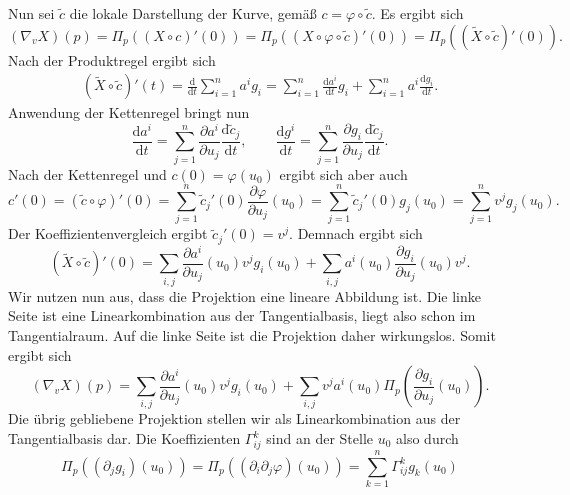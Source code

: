 Nun sei $\tilde c$ die lokale Darstellung der Kurve, gemäß
$c=\varphi\circ\tilde c$. Es ergibt sich
\begin{equation}
(\nabla_v X)(p) = \Pi_p((X\circ c)'(0))
= \Pi_p((X\circ\varphi\circ\tilde c)'(0))
= \Pi_p((\tilde X\circ\tilde c)'(0)).
\end{equation}
Nach der Produktregel ergibt sich
\begin{gather}
(\tilde X\circ\tilde c)'(t)
= \frac{\mathrm d}{\mathrm dt} \sum_{i=1}^n a^i g_i
= \sum_{i=1}^n \frac{\mathrm da^i}{\mathrm dt}g_i
+ \sum_{i=1}^n a^i\frac{\mathrm dg_i}{\mathrm dt}.
\end{gather}
Anwendung der Kettenregel bringt nun
\begin{equation}
\frac{\mathrm da^i}{\mathrm dt}
= \sum_{j=1}^n \frac{\partial a^i}{\partial u_j}
\frac{\mathrm d\tilde c_j}{\mathrm dt},\qquad
\frac{\mathrm dg^i}{\mathrm dt}
= \sum_{j=1}^n \frac{\partial g_i}{\partial u_j}
\frac{\mathrm d\tilde c_j}{\mathrm dt}.
\end{equation}
Nach der Kettenregel und $c(0)=\varphi(u_0)$ ergibt sich aber auch
\begin{equation}
c'(0) = (\tilde c\circ\varphi)'(0)
= \sum_{j=1}^n \tilde c_j'(0)\frac{\partial\varphi}{\partial u_j}(u_0)
= \sum_{j=1}^n \tilde c_j'(0)g_j(u_0)
= \sum_{j=1}^n v^j g_j(u_0).
\end{equation}
Der Koeffizientenvergleich ergibt $\tilde c_j'(0)=v^j$. Demnach ergibt sich
\begin{equation}
(\tilde X\circ\tilde c)'(0)
= \sum_{i,j} \frac{\partial a^i}{\partial u_j}(u_0) v^j g_i(u_0)
+ \sum_{i,j} a^i(u_0) \frac{\partial g_i}{\partial u_j}(u_0) v^j.
\end{equation}
Wir nutzen nun aus, dass die Projektion eine lineare Abbildung ist.
Die linke Seite ist eine Linearkombination aus der Tangentialbasis,
liegt also schon im Tangentialraum. Auf die linke Seite ist die
Projektion daher wirkungslos. Somit ergibt sich
\begin{equation}\label{eq:kov-Ableitung1}
(\nabla_v X)(p) = \sum_{i,j} \frac{\partial a^i}{\partial u_j}(u_0) v^j g_i(u_0)
+ \sum_{i,j} v^j a^i(u_0) \Pi_p(\frac{\partial g_i}{\partial u_j}(u_0)).
\end{equation}
Die übrig gebliebene Projektion stellen wir als Linearkombination
aus der Tangentialbasis dar. Die Koeffizienten $\Gamma_{ij}^k$
sind an der Stelle $u_0$ also durch%
\begin{equation}
\Pi_p((\partial_j g_i)(u_0))
= \Pi_p((\partial_i\partial_j\varphi)(u_0))
= \sum_{k=1}^n \Gamma_{ij}^k g_k(u_0)
\end{equation}
